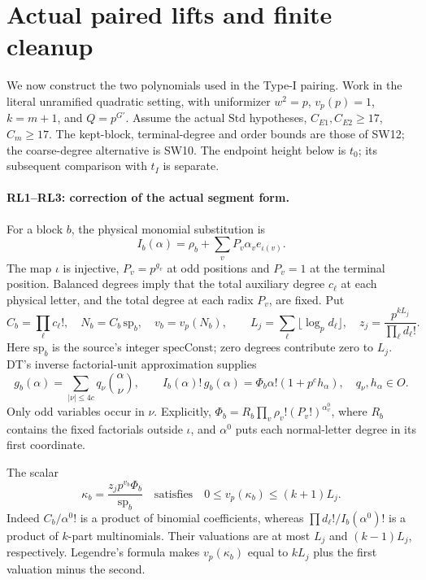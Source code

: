 \documentclass[11pt,a4paper]{article}
\numberwithin{equation}{section}
\theoremstyle{remark}\newtheorem{remark}[theorem]{Remark}
\begin{document}
\section{Actual paired lifts and finite cleanup}
\label{sec:paired-lifts}

We now construct the two polynomials used in the Type-I pairing. Work
in the literal unramified quadratic setting, with uniformizer \(w^2=p\),
\(v_p(p)=1\), \(k=m+1\), and \(Q=p^{G'}\). Assume the actual
\(\mathrm{Std}\) hypotheses, \(C_{E1},C_{E2}\ge17\), \(C_m\ge17\).
The kept-block, terminal-degree and order bounds are those of SW12;
the coarse-degree alternative is SW10. The endpoint height below is
\(t_0\); its subsequent comparison with \(t_I\) is separate.

\paragraph{RL1--RL3: correction of the actual segment form.}
For a block \(b\), the physical monomial substitution is
\[
 I_b(\alpha)=\rho_b+\sum_v P_v\alpha_v e_{\iota(v)}.
\]
The map \(\iota\) is injective, \(P_v=p^{g_v}\) at odd positions and
\(P_v=1\) at the terminal position. Balanced degrees imply that the
total auxiliary degree \(c_\ell\) at each physical letter, and the total
degree at each radix \(P_v\), are fixed. Put
\[
 C_b=\prod_\ell c_\ell!,\quad N_b=C_b\,\mathrm{sp}_b,\quad
 v_b=v_p(N_b),\qquad
 L_j=\sum_\ell\lfloor\log_p d_\ell\rfloor,\quad
 z_j=\frac{p^{kL_j}}{\prod_\ell d_\ell!}.
\]
Here \(\mathrm{sp}_b\) is the source's integer \(\mathrm{specConst}\);
zero degrees contribute zero to \(L_j\).
DT's inverse factorial-unit approximation supplies
\[
 g_b(\alpha)=\sum_{|\nu|\le4c}q_\nu\binom{\alpha}{\nu},\qquad
 I_b(\alpha)!\,g_b(\alpha)
   =\Phi_b\alpha!(1+p^ch_\alpha),\quad q_\nu,h_\alpha\in O.
 \tag{RL.1}
\]
Only odd variables occur in \(\nu\). Explicitly,
\(\Phi_b=R_b\prod_v\rho_v!(P_v!)^{\alpha^0_v}\), where \(R_b\)
contains the fixed factorials outside \(\iota\), and \(\alpha^0\)
puts each normal-letter degree in its first coordinate.

The scalar
\[
 \kappa_b=\frac{z_jp^{v_b}\Phi_b}{\mathrm{sp}_b}
 \quad\text{satisfies}\quad
 0\le v_p(\kappa_b)\le(k+1)L_j.                  \tag{RL.2}
\]
Indeed \(C_b/\alpha^0!\) is a product of binomial coefficients, whereas
\(\prod d_\ell!/I_b(\alpha^0)!\) is a product of \(k\)-part multinomials.
Their valuations are at most \(L_j\) and \((k-1)L_j\), respectively.
Legendre's formula makes \(v_p(\kappa_b)\) equal to \(kL_j\) plus the
first valuation minus the second.
\end{document}
